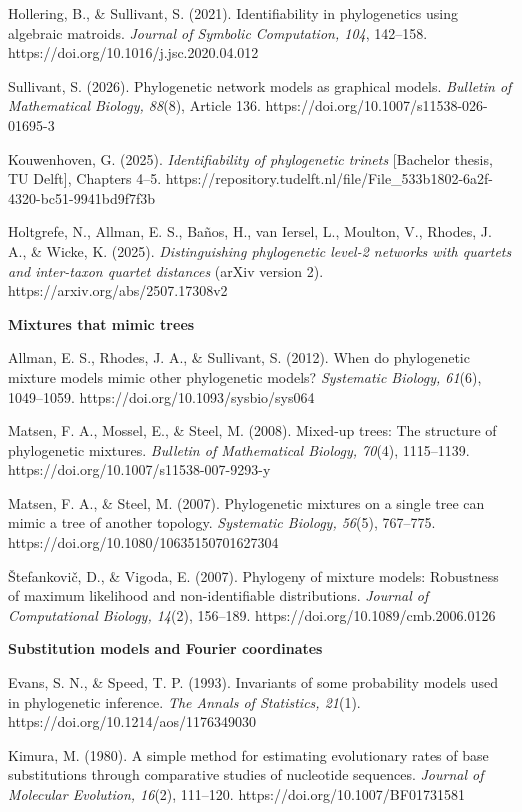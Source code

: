 \documentclass[
  11pt,
]{article}
\begin{document}
Hollering, B., \& Sullivant, S. (2021). Identifiability in phylogenetics
using algebraic matroids. \emph{Journal of Symbolic Computation, 104},
142--158. https://doi.org/10.1016/j.jsc.2020.04.012

Sullivant, S. (2026). Phylogenetic network models as graphical models.
\emph{Bulletin of Mathematical Biology, 88}(8), Article 136.
https://doi.org/10.1007/s11538-026-01695-3

Kouwenhoven, G. (2025). \emph{Identifiability of phylogenetic trinets}
{[}Bachelor thesis, TU Delft{]}, Chapters 4--5.
https://repository.tudelft.nl/file/File\_533b1802-6a2f-4320-bc51-9941bd9f7f3b

Holtgrefe, N., Allman, E. S., Baños, H., van Iersel, L., Moulton, V.,
Rhodes, J. A., \& Wicke, K. (2025). \emph{Distinguishing phylogenetic
level-2 networks with quartets and inter-taxon quartet distances} (arXiv
version 2). https://arxiv.org/abs/2507.17308v2

\textbf{Mixtures that mimic trees}

Allman, E. S., Rhodes, J. A., \& Sullivant, S. (2012). When do
phylogenetic mixture models mimic other phylogenetic models?
\emph{Systematic Biology, 61}(6), 1049--1059.
https://doi.org/10.1093/sysbio/sys064

Matsen, F. A., Mossel, E., \& Steel, M. (2008). Mixed-up trees: The
structure of phylogenetic mixtures. \emph{Bulletin of Mathematical
Biology, 70}(4), 1115--1139. https://doi.org/10.1007/s11538-007-9293-y

Matsen, F. A., \& Steel, M. (2007). Phylogenetic mixtures on a single
tree can mimic a tree of another topology. \emph{Systematic Biology,
56}(5), 767--775. https://doi.org/10.1080/10635150701627304

Štefankovič, D., \& Vigoda, E. (2007). Phylogeny of mixture models:
Robustness of maximum likelihood and non-identifiable distributions.
\emph{Journal of Computational Biology, 14}(2), 156--189.
https://doi.org/10.1089/cmb.2006.0126

\textbf{Substitution models and Fourier coordinates}

Evans, S. N., \& Speed, T. P. (1993). Invariants of some probability
models used in phylogenetic inference. \emph{The Annals of Statistics,
21}(1). https://doi.org/10.1214/aos/1176349030

Kimura, M. (1980). A simple method for estimating evolutionary rates of
base substitutions through comparative studies of nucleotide sequences.
\emph{Journal of Molecular Evolution, 16}(2), 111--120.
https://doi.org/10.1007/BF01731581
\end{document}
